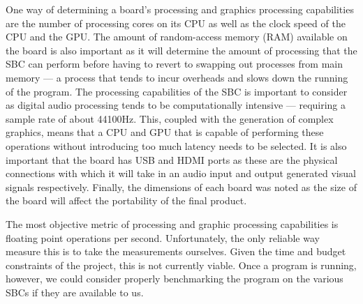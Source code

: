 \documentclass[../initial_thesis.tex]{subfiles}
\begin{document}
One way of determining a board's processing and graphics processing capabilities are the number of processing cores on its CPU as well as the clock speed of the CPU and the GPU. The amount of random-access memory (RAM) available on the board is also important as it will determine the amount of processing that the SBC can perform before having to revert to swapping out processes from main memory --- a process that tends to incur overheads and slows down the running of the program. The processing capabilities of the SBC is important to consider as digital audio processing tends to be computationally intensive --- requiring a sample rate of about 44100Hz. This, coupled with the generation of complex graphics, means that a CPU and GPU that is capable of performing these operations without introducing too much latency needs to be selected. It is also important that the board has USB and HDMI ports as these are the physical connections with which it will take in an audio input and output generated visual signals respectively. Finally, the dimensions of each board was noted as the size of the board will affect the portability of the final product. \par

The most objective metric of processing and graphic processing capabilities is floating point operations per second. Unfortunately, the only reliable way measure this is to take the measurements ourselves. Given the time and budget constraints of the project, this is not currently viable. Once a program is running, however, we could consider properly benchmarking the program on the various SBCs if they are available to us.
\end{document}
